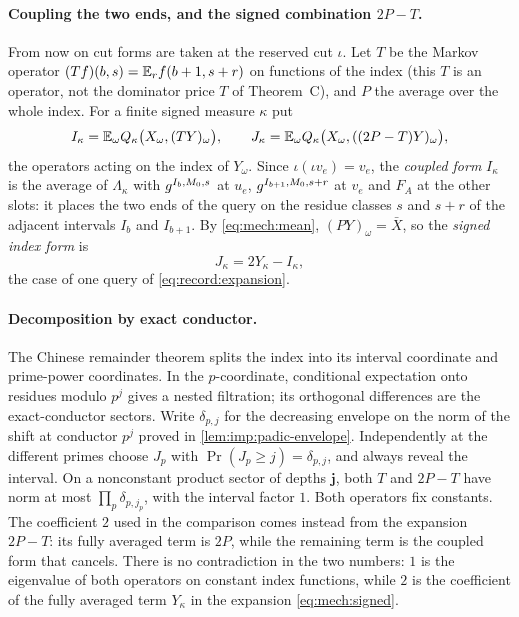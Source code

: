 \paragraph{Coupling the two ends, and the signed combination $2P-T$.}
From now on cut forms are taken at the reserved cut $\iota$. Let $T$ be the
Markov operator $(Tf)(b,s)=\mathbb E_rf(b+1,s+r)$ on functions of the index
(this $T$ is an operator, not the dominator price $T$ of
Theorem~C), and $P$
the average over the whole index. For a finite signed measure $\kappa$ put
\[
 I_\kappa=\mathbb E_\omega Q_\kappa\bigl(X_\omega,(TY)_\omega\bigr),\qquad
 J_\kappa=\mathbb E_\omega Q_\kappa\bigl(X_\omega,((2P-T)Y)_\omega\bigr),
\]
the operators acting on the index of $Y_\omega$. Since $\iota(\iota v_e)=v_e$,
the \emph{coupled form} $I_\kappa$ is the average of $\Lambda_\kappa$ with
$g^{I_b,M_0,s}$ at $u_e$, $g^{I_{b+1},M_0,s+r}$ at $v_e$ and $F_A$ at the
other slots: it places the two ends of the query on the residue classes $s$
and $s+r$ of the adjacent intervals $I_b$ and $I_{b+1}$. By
\eqref{eq:mech:mean}, $(PY)_\omega=\bar X$, so the \emph{signed index form} is
\begin{equation}\label{eq:mech:signed}
 J_\kappa=2Y_\kappa-I_\kappa ,
\end{equation}
the case of one query of \eqref{eq:record:expansion}.

\paragraph{Decomposition by exact conductor.}
The Chinese remainder theorem splits the index into its interval coordinate
and prime-power coordinates. In the $p$-coordinate, conditional expectation
onto residues modulo $p^j$ gives a nested filtration; its orthogonal
differences are the exact-conductor sectors. Write $\delta_{p,j}$ for the
decreasing envelope on the norm of the shift at conductor $p^j$ proved in
\cref{lem:imp:padic-envelope}. Independently at the different primes choose
$J_p$ with $\Pr(J_p\ge j)=\delta_{p,j}$, and always reveal the interval.
On a nonconstant product sector of depths $\mathbf j$, both $T$ and $2P-T$
have norm at most $\prod_p\delta_{p,j_p}$, with the interval factor $1$.
Both operators fix constants. The coefficient $2$ used in the comparison
comes instead from the expansion $2P-T$: its fully averaged term is $2P$,
while the remaining term is the coupled form that cancels. There
is no contradiction in the two numbers: $1$ is the eigenvalue of
both operators on constant index functions, while $2$ is the
coefficient of the fully averaged term $Y_\kappa$ in the expansion
\eqref{eq:mech:signed}.

